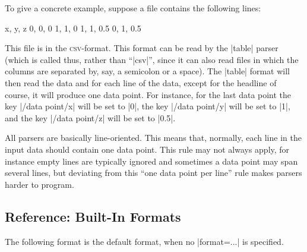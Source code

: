 To give a concrete example, suppose a file contains the following
lines:
%
\begin{codeexample}
x, y, z
0, 0, 0
1, 1, 0
1, 1, 0.5
0, 1, 0.5
\end{codeexample}
%
This file is in the \textsc{csv}-format. This format can be read by the |table|
parser (which is called thus, rather than ``|csv|'', since it can also read
files in which the columns are separated by, say, a semicolon or a space). The
|table| format will then read the data and for each line of the data, except
for the headline of course, it will produce one data point. For instance, for
the last data point the key |/data point/x| will be set to |0|, the key
|/data point/y| will be set to |1|, and the key |/data point/z| will be set to
|0.5|.

All parsers are basically line-oriented. This means that, normally, each line
in the input data should contain one data point. This rule may not always
apply, for instance empty lines are typically ignored and sometimes a data
point may span several lines, but deviating from this ``one data point per
line'' rule makes parsers harder to program.


\subsection{Reference: Built-In Formats}

The following format is the default format, when no |format=...| is specified.

